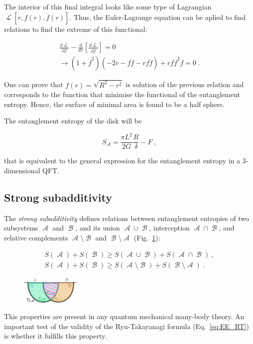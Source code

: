 \documentclass[twocolumn]{revtex4}
\providecommand{\eq}[2]{
    \begin{equation}
        #2
    \label{eq:#1}
    \end{equation}
}
\providecommand{\eqgat}[2]{
    \begin{gather}
        #2
    \label{eq:#1}
    \end{gather}
}
\DeclareMathOperator{\calA}{\mathcal{A}}
\DeclareMathOperator{\calB}{\mathcal{B}}
\DeclareMathOperator{\calL}{\mathcal{L}}
\begin{document}
The interior of this final integral looks like some type of Lagrangian $\calL [r,f(r),\dot{f}(r)]$. Thus, the Euler-Lagrange equation can be aplied to find relations to find the extreme of this functional:
\eqgat{1EL}{
    \frac{\partial \calL}{\partial f} - \frac{d}{dr} \left[ \frac{\partial \calL}{\partial \dot{f}} \right] = 0 \nonumber \\
    \longrightarrow \left( 1+\dot{f}^2 \right) \left( -2r-f\dot{f}-rf\ddot{f} \right) + rf\dot{f}^2\ddot{f} = 0 \ .
}

One can prove that $f(r) = \sqrt{R^2 - r^2}$ is solution of the previous relation and corresponds to the function that minimise the functional of the entanglement entropy. Hence, the surface of minimal area is found to be a half sphere.

The entanglement entropy of the disk will be
\eq{1sol}{
    S_{\calA} = \frac{\pi L^2}{2G} \frac{R}{\delta} - F \ ,
}
that is equivalent to the general expression for the entanglement entropy in a 3-dimensional QFT.


\subsection{Strong subadditivity} \label{ss:SS}

The \textit{strong subadditivity} \cite{headrick_holographic_2007} defines relations between entanglement entropies of two subsystems $\calA$ and $\calB$, and its union $\calA \cup \calB$, interception $\calA \cap \calB$, and relative complements $\calA \setminus \calB$ and $\calB \setminus \calA$ (Fig.~\ref{fig:SS}):
\eqgat{EE_strong-subadd}{
    S(\calA) + S(\calB) \ge S(\calA \cup \calB) + S(\calA \cap \calB) \ , \nonumber \\
    S(\calA) + S(\calB) \ge S(\calA \setminus \calB) + S(\calB \setminus \calA) \ .
}

\begin{figure}
    \centering
    \includegraphics[width=0.25\textwidth]{../Imatges/SS_D.png}
\caption{}
\label{fig:SS}
\end{figure}

This properties are present in any quantum mechanical many-body theory. An important test of the validity of the Ryu-Takayanagi formula (Eq.~\ref{eq:EE_RT}) is whether it fulfills this property.
\end{document}
